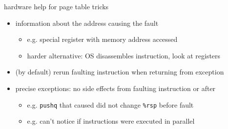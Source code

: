 \begin{frame}{hardware help for page table tricks}
\begin{itemize}
\item information about the address causing the fault
    \begin{itemize}
    \item e.g. special register with memory address accessed
    \item harder alternative: OS disassembles instruction, look at registers
    \end{itemize}
\item (by default) rerun faulting instruction when returning from exception
\item precise exceptions: no side effects from faulting instruction or after
    \begin{itemize}
    \item e.g. {\tt pushq} that caused did not change {\tt \%rsp} before fault
    \item e.g. can't notice if instructions were executed in parallel
    \end{itemize}
\end{itemize}
\end{frame}
